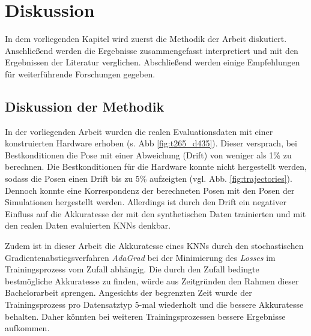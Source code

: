 
\section{Diskussion}
\label{sec:kapitel_5}
In dem vorliegenden Kapitel wird zuerst die Methodik der Arbeit diskutiert. Anschließend werden die Ergebnisse zusammengefasst interpretiert und mit den Ergebnissen der Literatur verglichen. Abschließend werden einige Empfehlungen für weiterführende Forschungen gegeben. 


\subsection{Diskussion der Methodik}
\label{subsec:disc_methode}

In der vorliegenden Arbeit wurden die realen Evaluationsdaten mit einer konstruierten Hardware erhoben (s. Abb \ref{fig:t265_d435}). Dieser versprach, bei Bestkonditionen die Pose mit einer Abweichung (Drift) von weniger als 1\% zu berechnen. Die Bestkonditionen für die Hardware konnte nicht hergestellt werden, sodass die Posen einen Drift bis zu 5\% aufzeigten (vgl. Abb. \ref{fig:trajectories}). Dennoch konnte eine Korrespondenz der berechneten Posen mit den Posen der Simulationen hergestellt werden. Allerdings ist durch den Drift ein negativer Einfluss auf die Akkuratesse der mit den synthetischen Daten trainierten und mit den realen Daten evaluierten KNNs denkbar.


Zudem ist in dieser Arbeit die Akkuratesse eines KNNs durch den stochastischen Gradientenabstiegsverfahren \textit{AdaGrad} bei der Minimierung des \textit{Losses} im Trainingsprozess vom Zufall abhängig. Die durch den Zufall bedingte bestmögliche Akkuratesse zu finden, würde aus Zeitgründen den Rahmen dieser Bachelorarbeit sprengen. Angesichts der begrenzten Zeit wurde der Trainingsprozess pro Datensatztyp 5-mal wiederholt und die bessere Akkuratesse behalten. Daher könnten bei weiteren Trainingsprozessen bessere Ergebnisse aufkommen.

